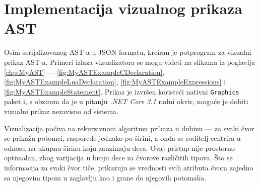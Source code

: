 \section{Implementacija vizualnog prikaza AST}
\label{sec:ImplementationVisualizer}

Osim serijalizovanog AST-a u JSON formatu, kreiran je potprogram za vizualni prikaz AST-a. Primeri izlaza vizualizatora se mogu videti na slikama iz poglavlja \ref{chp:MyAST} --- \ref{fig:MyASTExampleCDeclaration}, \ref{fig:MyASTExampleLuaDeclaration}, \ref{fig:MyASTExampleExpressions} i \ref{fig:MyASTExampleStatement}. Prikaz je izvršen koristeći nativni \texttt{Graphics} paket i, s obzirom da je u pitanju \emph{.NET Core 3.1} radni okvir, moguće je dobiti vizualni prikaz nezavisno od sistema.

Vizualizacija počiva na rekurzivnom algoritmu prikaza u dubinu --- za svaki čvor se prikažu potomci, rasporede jednako po širini, a onda se roditelj centrira u odnosu na ukupnu širinu koju zauzimaju deca. Ovaj pristup nije prostorno optimalan, zbog varijacija u broju dece za čvorove različitih tipova. Što se informacija za svaki čvor tiče, prikazuju se vrednosti svih atributa čvora zajedno sa njegovim tipom u zaglavlju kao i grane do njegovih potomaka.
